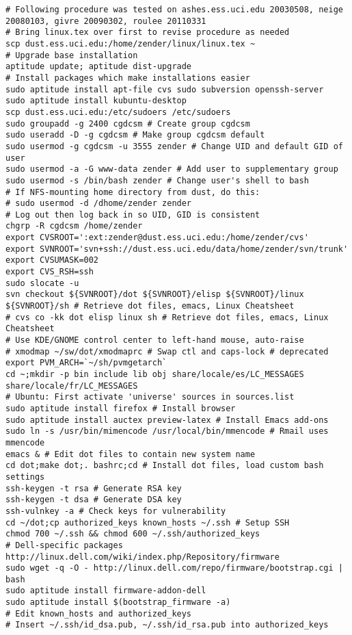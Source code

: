 \documentclass[12pt,twoside]{article}
\begin{document}
\begin{verbatim}
# Following procedure was tested on ashes.ess.uci.edu 20030508, neige 20080103, givre 20090302, roulee 20110331
# Bring linux.tex over first to revise procedure as needed
scp dust.ess.uci.edu:/home/zender/linux/linux.tex ~
# Upgrade base installation
aptitude update; aptitude dist-upgrade 
# Install packages which make installations easier
sudo aptitude install apt-file cvs sudo subversion openssh-server
sudo aptitude install kubuntu-desktop
scp dust.ess.uci.edu:/etc/sudoers /etc/sudoers
sudo groupadd -g 2400 cgdcsm # Create group cgdcsm
sudo useradd -D -g cgdcsm # Make group cgdcsm default
sudo usermod -g cgdcsm -u 3555 zender # Change UID and default GID of user
sudo usermod -a -G www-data zender # Add user to supplementary group
sudo usermod -s /bin/bash zender # Change user's shell to bash
# If NFS-mounting home directory from dust, do this:
# sudo usermod -d /dhome/zender zender 
# Log out then log back in so UID, GID is consistent
chgrp -R cgdcsm /home/zender
export CVSROOT=':ext:zender@dust.ess.uci.edu:/home/zender/cvs'
export SVNROOT='svn+ssh://dust.ess.uci.edu/data/home/zender/svn/trunk'
export CVSUMASK=002
export CVS_RSH=ssh
sudo slocate -u
svn checkout ${SVNROOT}/dot ${SVNROOT}/elisp ${SVNROOT}/linux ${SVNROOT}/sh # Retrieve dot files, emacs, Linux Cheatsheet
# cvs co -kk dot elisp linux sh # Retrieve dot files, emacs, Linux Cheatsheet
# Use KDE/GNOME control center to left-hand mouse, auto-raise 
# xmodmap ~/sw/dot/xmodmaprc # Swap ctl and caps-lock # deprecated
export PVM_ARCH=`~/sh/pvmgetarch`
cd ~;mkdir -p bin include lib obj share/locale/es/LC_MESSAGES share/locale/fr/LC_MESSAGES
# Ubuntu: First activate 'universe' sources in sources.list
sudo aptitude install firefox # Install browser
sudo aptitude install auctex preview-latex # Install Emacs add-ons
sudo ln -s /usr/bin/mimencode /usr/local/bin/mmencode # Rmail uses mmencode
emacs & # Edit dot files to contain new system name
cd dot;make dot;. bashrc;cd # Install dot files, load custom bash settings
ssh-keygen -t rsa # Generate RSA key
ssh-keygen -t dsa # Generate DSA key
ssh-vulnkey -a # Check keys for vulnerability
cd ~/dot;cp authorized_keys known_hosts ~/.ssh # Setup SSH
chmod 700 ~/.ssh && chmod 600 ~/.ssh/authorized_keys
# Dell-specific packages http://linux.dell.com/wiki/index.php/Repository/firmware
sudo wget -q -O - http://linux.dell.com/repo/firmware/bootstrap.cgi | bash
sudo aptitude install firmware-addon-dell
sudo aptitude install $(bootstrap_firmware -a)
# Edit known_hosts and authorized_keys
# Insert ~/.ssh/id_dsa.pub, ~/.ssh/id_rsa.pub into authorized_keys

\end{verbatim}
\end{document}
